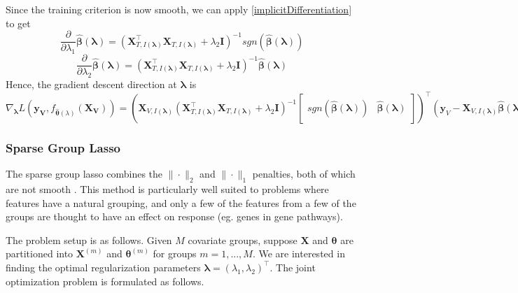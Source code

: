 \documentclass[10pt,letterpaper]{article}
\begin{document}
Since the training criterion is now smooth, we can apply \eqref{implicitDifferentiation} to get
\begin{equation}
\frac{\partial}{\partial \lambda_1} \hat{\boldsymbol{\beta}}(\boldsymbol{\lambda}) =
(\boldsymbol{X}_{T, I(\boldsymbol\lambda)}^\top \boldsymbol{X}_{T, I(\boldsymbol\lambda)} + \lambda_2 \boldsymbol{I})^{-1}
sgn \left (\hat{\boldsymbol{\beta}} (\boldsymbol{\lambda}) \right )
\end{equation}
\begin{equation}
\frac{\partial}{\partial \lambda_2} \hat{\boldsymbol{\beta}}(\boldsymbol{\lambda}) = (\boldsymbol{X}_{T, I(\boldsymbol\lambda)}^\top\boldsymbol{X}_{T, I(\boldsymbol\lambda)} + \lambda_2 \boldsymbol{I})^{-1}\hat{\boldsymbol{\beta}} (\boldsymbol{\lambda})
\end{equation}
Hence, the gradient descent direction at $\boldsymbol{\lambda}$ is
\begin{equation}
\nabla_{\boldsymbol \lambda} L(\boldsymbol{y_V}, f_{\hat{\boldsymbol{\theta}}(\lambda)}(\boldsymbol{X_V})) =
\left (
\boldsymbol{X}_{V, I(\boldsymbol\lambda)}
\left (
\boldsymbol{X}_{T, I(\boldsymbol\lambda)}^\top \boldsymbol{X}_{T, I(\boldsymbol\lambda)} + \lambda_2 \boldsymbol{I}
\right )^{-1}
\begin{bmatrix}
sgn(\hat{\boldsymbol{\beta}} (\boldsymbol{\lambda})) & \hat{\boldsymbol{\beta}} (\boldsymbol{\lambda})
\end{bmatrix}
\right )^{\top}
\left (
\boldsymbol y_V - \boldsymbol{X}_{V, I(\boldsymbol\lambda)} \hat{\boldsymbol{\beta}} (\boldsymbol{\lambda})
\right )
\end{equation}

\subsubsection{Sparse Group Lasso}

The sparse group lasso combines the $\|\cdot\|_2$ and $\|\cdot\|_1$ penalties, both of which are not smooth \citep{simon2013sparse}. This method is particularly well suited to problems where features have a natural grouping, and only a few of the features from a few of the groups are thought to have an effect on response (eg. genes in gene pathways).

The problem setup is as follows. Given $M$ covariate groups, suppose $\boldsymbol{X}$ and $\boldsymbol \theta$ are partitioned into $\boldsymbol{X}^{(m)}$ and $\boldsymbol \theta^{(m)}$ for groups $m = 1, ... , M$. We are interested in finding the optimal regularization parameters $\boldsymbol{\lambda} = (\lambda_1, \lambda_2)^\top$. The joint optimization problem is formulated as follows.
\end{document}
